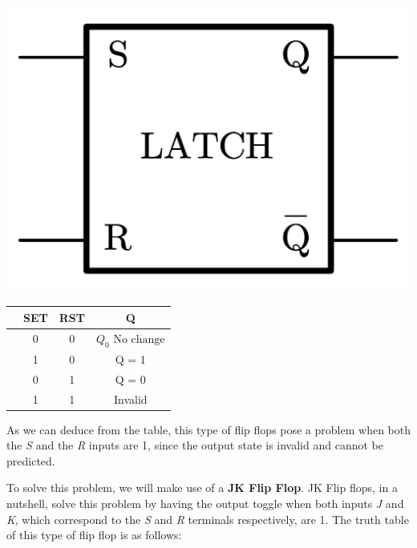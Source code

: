 \documentclass[a4paper, 11pt, oneside]{article}
\begin{document}
\begin{minipage}{\textwidth}
    \begin{minipage}[b]{0.49\textwidth}
        \centering
        \includegraphics[scale=0.2]{Graphics/Practice 2/GRAPHICS/LOGIC GATES/SR ASYNCH.pdf}
        \label{fig:SR_Asynch}
    \end{minipage}
    \hfill
    \begin{minipage}[b]{0.49\textwidth}
        \centering
             \begin{tabular}[t]{lccc}
                \toprule
                &\textbf{SET}&\textbf{RST}&\textbf{Q}\\
                \midrule
                & 0 & 0 & $Q_0 \text{ No change}$\\
                & 1 & 0 & Q = 1\\
                & 0 & 1 & Q = 0\\
                & 1 & 1 & Invalid\\
                \bottomrule
            \end{tabular}
    \end{minipage}
\end{minipage}\textbf{}

\clearpage

As we can deduce from the table, this type of flip flops pose a problem when both the \textit{S} and the \textit{R} inputs are 1, since the output state is invalid and cannot be predicted.\medskip

To solve this problem, we will make use of a \textbf{JK Flip Flop}. JK Flip flops, in a nutshell, solve this problem by having the output toggle when both inputs \textit{J} and \textit{K}, which correspond to the \textit{S} and \textit{R} terminals respectively, are 1. The truth table of this type of flip flop is as follows:\bigskip
\end{document}
